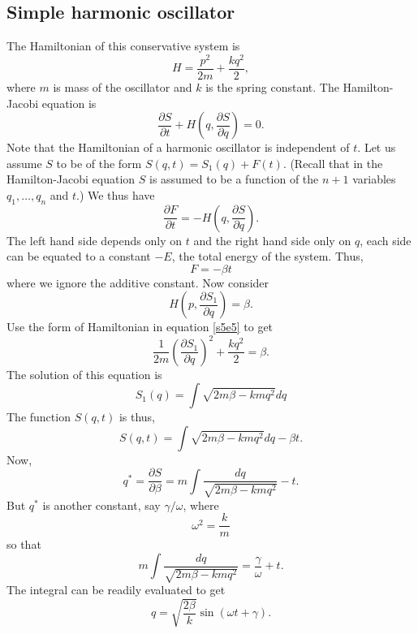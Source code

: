 \documentclass{article}
\newcommand{\pd}[2]{\frac{\partial{#1}}{\partial{#2}}}
\numberwithin{equation}{section}
\theoremstyle{plain}
\numberwithin{thm}{section}
\theoremstyle{plain}
\numberwithin{prop}{section}
\theoremstyle{definition}
\numberwithin{defn}{section}
\theoremstyle{remark}
\begin{document}
\subsection{Simple harmonic oscillator}
The Hamiltonian of this conservative system is
\begin{equation}\label{s5e5}
H = \frac{p^2}{2m} + \frac{kq^2}{2},
\end{equation}
where $m$ is mass of the oscillator and $k$ is the spring constant. The 
Hamilton-Jacobi equation is
\begin{equation}\label{s5e6}
\pd{S}{t} + H\left(q, \pd{S}{q}\right) = 0.
\end{equation}
Note that the Hamiltonian of a harmonic oscillator is independent of $t$.
Let us assume $S$ to be of the form $S(q, t) = S_1(q) + F(t)$. (Recall that
in the Hamilton-Jacobi equation $S$ is assumed to be a function of the $n+1$
variables $q_1, \ldots, q_n$ and $t$.) We thus have
\[
\pd{F}{t} = -H\left(q, \pd{S}{q}\right).
\]
The left hand side depends only on $t$ and the right hand side only on $q$, 
each side can be equated to a constant $-E$, the total energy of the system.
Thus,
\begin{equation}\label{s5e7}
F = -\beta t
\end{equation}
where we ignore the additive constant. Now consider
\begin{equation}\label{s5e8}
H\left(p, \pd{S_1}{q}\right) = \beta.
\end{equation}
Use the form of Hamiltonian in equation \eqref{s5e5} to get
\begin{equation}\label{s5e9}
\frac{1}{2m}\left(\pd{S_1}{q}\right)^2 + \frac{kq^2}{2} = \beta.
\end{equation}
The solution of this equation is
\begin{equation}\label{s5e10}
S_1(q) = \int\sqrt{2m\beta - kmq^2}dq 
\end{equation}
The function $S(q, t)$ is thus,
\begin{equation}\label{s5e11}
S(q, t) = \int\sqrt{2m\beta - kmq^2}dq - \beta t.
\end{equation}
Now,
\begin{equation}\label{s5e12}
q^\ast = \pd{S}{\beta} = m\int\frac{dq}{\sqrt{2m\beta - kmq^2}} - t.
\end{equation}
But $q^\ast$ is another constant, say $\gamma/\omega$, where
\begin{equation}\label{s5e13}
\omega^2 = \frac{k}{m}
\end{equation}
so that
\[
m\int\frac{dq}{\sqrt{2m\beta - kmq^2}} = \frac{\gamma}{\omega} + t.
\]
The integral can be readily evaluated to get
\begin{equation}\label{s5e14}
q = \sqrt{\frac{2\beta}{k}}\sin(\omega t + \gamma).
\end{equation}
\end{document}
